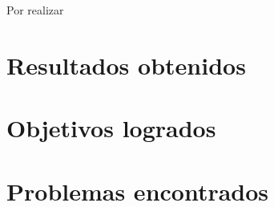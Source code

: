\documentclass[../main.tex]{subfiles}
\begin{document}
Por realizar
\section{Resultados obtenidos}
\section{Objetivos logrados}
\section{Problemas encontrados}
\end{document}
